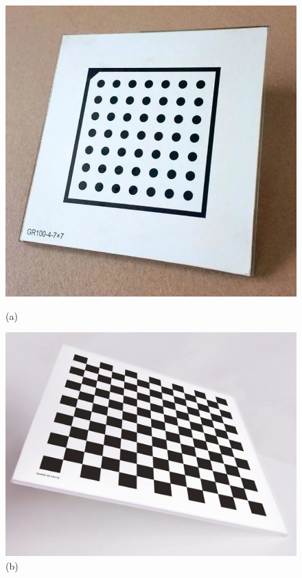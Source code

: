 \begin{figure}
	\centering
	\includegraphics[width=\linewidth]{images/calib-dots.png}
	\caption*{(a)}
	\endminipage\hfill
	\includegraphics[width=\linewidth]{images/calib-chessb.jpg}
	\caption*{(b)}
	\endminipage\hfill

\end{figure}
